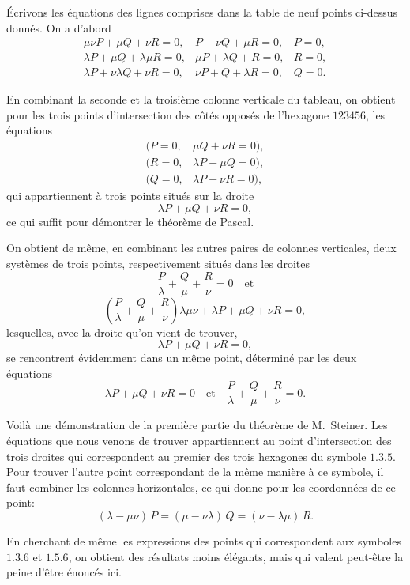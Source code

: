 \documentclass[11pt,a4paper]{book}
\begin{document}
\'Ecrivons les \'equations des lignes comprises dans la table de neuf points ci-dessus donn\'es. On a d'abord
\[
\begin{array}{lll}
\mu\nu P + \mu Q + \nu R = 0, & P + \nu Q + \mu R = 0, & P = 0, \\
\lambda P + \mu Q + \lambda\mu R = 0, & \mu P + \lambda Q + R = 0, & R = 0, \\
\lambda P + \nu\lambda Q + \nu R = 0, & \nu P + Q + \lambda R = 0, & Q = 0.
\end{array}
\]

En combinant la seconde et la troisi\`eme colonne verticale du tableau, on obtient pour les trois points d'intersection des c\^ot\'es oppos\'es de l'hexagone $123456$, les \'equations
\[
\begin{array}{ll}
( P = 0, & \mu Q + \nu R = 0 ), \\
( R = 0, & \lambda P + \mu Q = 0 ), \\
( Q = 0, & \lambda P + \nu R = 0 ),
\end{array}
\]
qui appartiennent \`a trois points situ\'es sur la droite
\[
\lambda P + \mu Q + \nu R = 0,
\]
ce qui suffit pour d\'emontrer le th\'eor\`eme de Pascal.

On obtient de m\^eme, en combinant les autres paires de colonnes verticales, deux syst\`emes de trois points, respectivement situ\'es dans les droites
\[
\frac{P}{\lambda} + \frac{Q}{\mu} + \frac{R}{\nu} = 0 \quad \text{et}
\]
\[
\left(\frac{P}{\lambda} + \frac{Q}{\mu} + \frac{R}{\nu}\right) \lambda\mu\nu + \lambda P + \mu Q + \nu R = 0,
\]
lesquelles, avec la droite qu'on vient de trouver,
\[
\lambda P + \mu Q + \nu R = 0,
\]
se rencontrent \'evidemment dans un m\^eme point, d\'etermin\'e par les deux \'equations
\[
\lambda P + \mu Q + \nu R = 0 \quad \text{et} \quad \frac{P}{\lambda} + \frac{Q}{\mu} + \frac{R}{\nu} = 0.
\]

Voil\`a une d\'emonstration de la premi\`ere partie du th\'eor\`eme de M.~Steiner. Les \'equations que nous venons de trouver appartiennent au point d'intersection des trois droites qui correspondent au premier des trois hexagones du symbole $1.3.5$. Pour trouver l'autre point correspondant de la m\^eme mani\`ere \`a ce symbole, il faut combiner les colonnes horizontales, ce qui donne pour les coordonn\'ees de ce point:
\[
(\lambda - \mu\nu)\, P = (\mu - \nu\lambda)\, Q = (\nu - \lambda\mu)\, R.
\]

En cherchant de m\^eme les expressions des points qui correspondent aux symboles $1.3.6$ et $1.5.6$, on obtient des r\'esultats moins \'el\'egants, mais qui valent peut-\^etre la peine d'\^etre \'enonc\'es ici.
\end{document}
